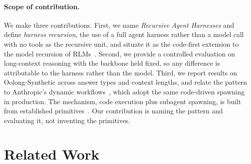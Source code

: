 \documentclass[sigconf,nonacm]{acmart}
\begin{document}
\paragraph{Scope of contribution.}
We make three contributions. First, we name \emph{Recursive Agent Harnesses} and define
\emph{harness recursion}, the use of a full agent harness rather than a model call with no tools as
the recursive unit, and situate it as the code-first extension to the model recursion of
RLMs~\cite{zhang2024rlm}. Second, we provide a controlled evaluation on long-context
reasoning with the backbone held fixed, so any difference is attributable to the harness
rather than the model. Third, we report results on Oolong-Synthetic across answer types and
context lengths, and relate the pattern to Anthropic's dynamic
workflows~\cite{anthropic2026workflows}, which adopt the same code-driven spawning in
production. The mechanism, code execution plus subagent spawning, is built from established
primitives~\cite{wang2024codeact,zhang2024rlm,wu2023autogen}. Our contribution is naming the
pattern and evaluating it, not inventing the primitives.


\section{Related Work}
\label{sec:related}
\end{document}
